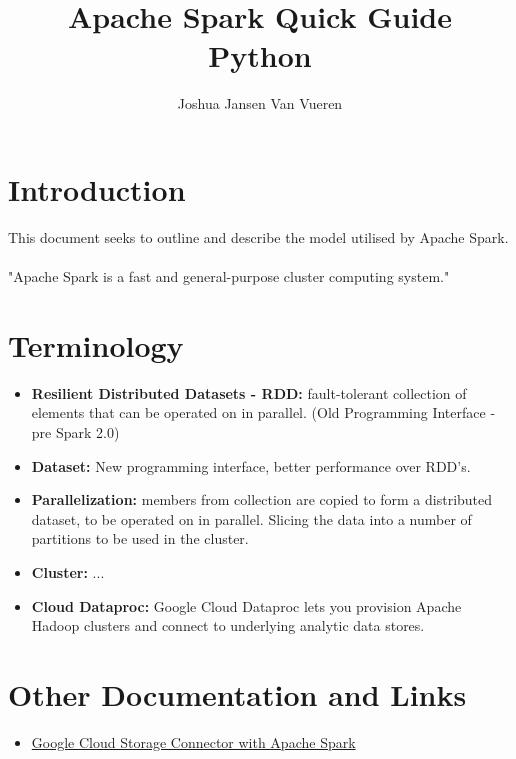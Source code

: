 \documentclass[english]{article}
\begin{document}
\title{Apache Spark Quick Guide \\
Python}


\author{Joshua Jansen Van Vueren}

\maketitle

\section*{Introduction}
This document seeks to outline and describe the model utilised by Apache Spark.
\\\\
"Apache Spark is a fast and general-purpose cluster computing system."

\section{Terminology}
\begin{itemize}
\item \textbf{Resilient Distributed Datasets - RDD: } fault-tolerant collection of elements that can be operated on in parallel. (Old Programming Interface - pre Spark 2.0)
\item \textbf{Dataset: } New programming interface, better performance over RDD's.
\item \textbf{Parallelization: } members from collection are copied to form a distributed dataset, to be operated on in parallel. Slicing the data into a number of partitions to be used in the cluster.
\item \textbf{Cluster: } ...
\item \textbf{Cloud Dataproc: } Google Cloud Dataproc lets you provision Apache Hadoop clusters and connect to underlying analytic data stores.
\end{itemize}

\section{Other Documentation and Links}
\begin{itemize}
\item \href{https://cloud.google.com/dataproc/docs/tutorials/gcs-connector-spark-tutorial}{Google Cloud Storage Connector with Apache Spark}
\end{itemize}
\end{document}
